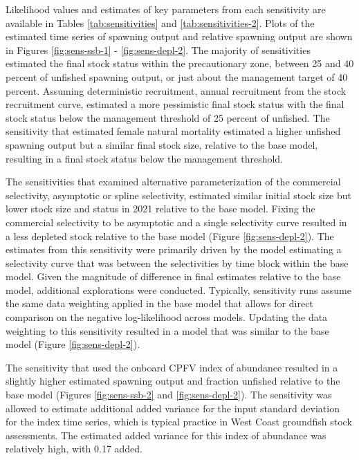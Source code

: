 \documentclass[11pt,
  english,
  a4paper,
]{article}
\begin{document}

Likelihood values and estimates of key parameters from each sensitivity are available in Tables \ref{tab:sensitivities} and \ref{tab:sensitivities-2}. Plots of the estimated time series of spawning output and relative spawning output are shown in Figures \ref{fig:sens-ssb-1} - \ref{fig:sens-depl-2}. The majority of sensitivities estimated the final stock status within the precautionary zone, between 25 and 40 percent of unfished spawning output, or just about the management target of 40 percent. Assuming deterministic recruitment, annual recruitment from the stock recruitment curve, estimated a more pessimistic final stock status with the final stock status below the management threshold of 25 percent of unfished. The sensitivity that estimated female natural mortality estimated a higher unfished spawning output but a similar final stock size, relative to the base model, resulting in a final stock status below the management threshold.

\leavevmode\tagmcend\tagstructend\par


The sensitivities that examined alternative parameterization of the commercial selectivity, asymptotic or spline selectivity, estimated similar initial stock size but lower stock size and status in 2021 relative to the base model. Fixing the commercial selectivity to be asymptotic and a single selectivity curve resulted in a less depleted stock relative to the base model (Figure \ref{fig:sens-depl-2}). The estimates from this sensitivity were primarily driven by the model estimating a selectivity curve that was between the selectivities by time block within the base model. Given the magnitude of difference in final estimates relative to the base model, additional explorations were conducted. Typically, sensitivity runs assume the same data weighting applied in the base model that allows for direct comparison on the negative log-likelihood across models. Updating the data weighting to this sensitivity resulted in a model that was similar to the base model (Figure \ref{fig:sens-depl-2}).

\leavevmode\tagmcend\tagstructend\par


The sensitivity that used the onboard CPFV index of abundance resulted in a slightly higher estimated spawning output and fraction unfished relative to the base model (Figures \ref{fig:sens-ssb-2} and \ref{fig:sens-depl-2}). The sensitivity was allowed to estimate additional added variance for the input standard deviation for the index time series, which is typical practice in West Coast groundfish stock assessments. The estimated added variance for this index of abundance was relatively high, with 0.17 added.
\end{document}
